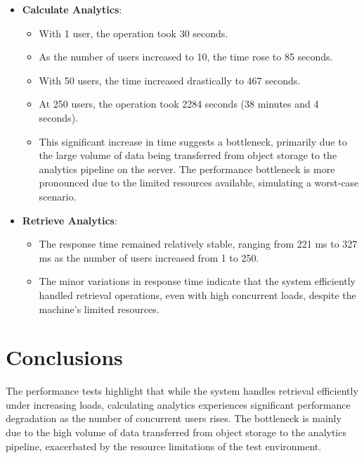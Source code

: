\begin{itemize}
    \item \textbf{Calculate Analytics}:
        \begin{itemize}
            \item With 1 user, the operation took 30 seconds.
            \item As the number of users increased to 10, the time rose to 85 seconds.
            \item With 50 users, the time increased drastically to 467 seconds.
            \item At 250 users, the operation took 2284 seconds (38 minutes and 4 seconds).
            \item This significant increase in time suggests a bottleneck, primarily due to the large volume of data being transferred from object storage to the analytics pipeline on the server. The performance bottleneck is more pronounced due to the limited resources available, simulating a worst-case scenario.
        \end{itemize}

    \item \textbf{Retrieve Analytics}:
        \begin{itemize}
            \item The response time remained relatively stable, ranging from 221 ms to 327 ms as the number of users increased from 1 to 250.
            \item The minor variations in response time indicate that the system efficiently handled retrieval operations, even with high concurrent loads, despite the machine's limited resources.
        \end{itemize}
\end{itemize}

\section{Conclusions}
The performance tests highlight that while the system handles retrieval efficiently under increasing loads, calculating analytics experiences significant performance degradation as the number of concurrent users rises. The bottleneck is mainly due to the high volume of data transferred from object storage to the analytics pipeline, exacerbated by the resource limitations of the test environment.

